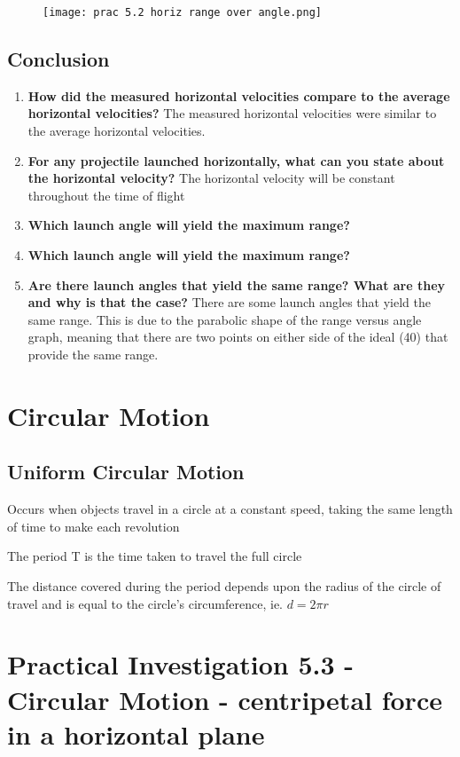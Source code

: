 		\begin{figure}[H]
			\centering
			\texttt{[image: prac 5.2 horiz range over angle.png]}
		\end{figure}

	\subsection{Conclusion}
		\begin{enumerate}
			\item \textbf{How did the measured horizontal velocities compare to the average horizontal velocities?}
				\subitem The measured horizontal velocities were similar to the average horizontal velocities.
			\item \textbf{For any projectile launched horizontally, what can you state about the horizontal velocity?}
				\subitem The horizontal velocity will be constant throughout the time of flight
			\item \textbf{Which launch angle will yield the maximum range?}
			\item \textbf{Which launch angle will yield the maximum range?}
				\textdegree
			\item \textbf{Are there launch angles that yield the same range? What are they and why is that the case?}
				\subitem There are some launch angles that yield the same range. This is due to the parabolic shape of the range versus angle graph, meaning that there are two points on either side of the ideal (40\textdegree) that provide the same range.
		\end{enumerate}
\newpage
\section{Circular Motion} \label{4/11/2024}
	\subsection{Uniform Circular Motion}
	Occurs when objects travel in a circle at a constant speed, taking the same length of time to make each revolution

	The period T is the time taken to travel the full circle

	The distance covered during the period depends upon the radius of the circle of travel and is equal to the circle's circumference, ie. $d=2\pi r$

\section{Practical Investigation 5.3 - Circular Motion - centripetal force in a horizontal plane}

